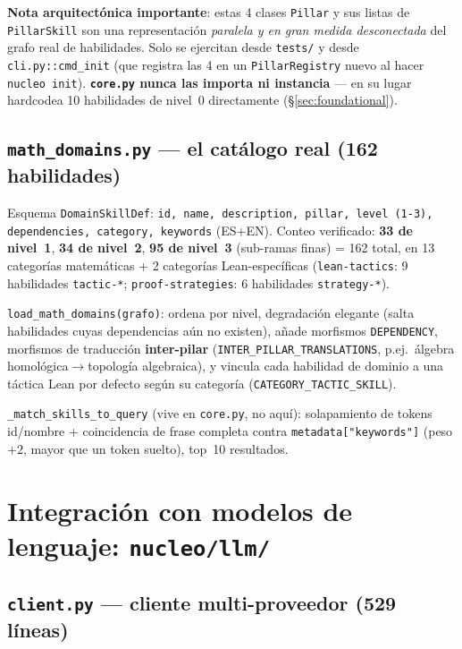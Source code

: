 \documentclass[11pt,a4paper]{report}
\newcommand{\code}[1]{\texttt{#1}}
\begin{document}
\textbf{Nota arquitect\'onica importante}: estas 4 clases \code{Pillar} y sus listas de \code{PillarSkill} son una representaci\'on \emph{paralela y en gran medida desconectada} del grafo real de habilidades. Solo se ejercitan desde \code{tests/} y desde \code{cli.py::cmd_init} (que registra las 4 en un \code{PillarRegistry} nuevo al hacer \code{nucleo init}). \textbf{\code{core.py} nunca las importa ni instancia} --- en su lugar hardcodea 10 habilidades de nivel~0 directamente (\S\ref{sec:foundational}).

\section{\code{math_domains.py} --- el cat\'alogo real (162 habilidades)}

Esquema \code{DomainSkillDef}: \code{id, name, description, pillar, level (1-3), dependencies, category, keywords} (ES+EN). Conteo verificado: \textbf{33 de nivel~1}, \textbf{34 de nivel~2}, \textbf{95 de nivel~3} (sub-ramas finas) = 162 total, en 13 categor\'ias matem\'aticas + 2 categor\'ias Lean-espec\'ificas (\code{lean-tactics}: 9 habilidades \code{tactic-*}; \code{proof-strategies}: 6 habilidades \code{strategy-*}).

\code{load_math_domains(grafo)}: ordena por nivel, degradaci\'on elegante (salta habilidades cuyas dependencias a\'un no existen), a\~nade morfismos \code{DEPENDENCY}, morfismos de traducci\'on \textbf{inter-pilar} (\code{INTER_PILLAR_TRANSLATIONS}, p.ej.\ \'algebra homol\'ogica$\to$topolog\'ia algebraica), y vincula cada habilidad de dominio a una t\'actica Lean por defecto seg\'un su categor\'ia (\code{CATEGORY_TACTIC_SKILL}).

\code{\_match_skills_to_query} (vive en \code{core.py}, no aqu\'i): solapamiento de tokens id/nombre + coincidencia de frase completa contra \code{metadata["keywords"]} (peso $+2$, mayor que un token suelto), top~10 resultados.

\chapter{Integraci\'on con modelos de lenguaje: \code{nucleo/llm/}}

\section{\code{client.py} --- cliente multi-proveedor (529 l\'ineas)}
\end{document}
